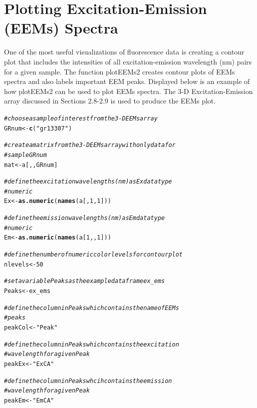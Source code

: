 \documentclass[a4paper,11pt]{article}\usepackage[]{graphicx}\usepackage[]{color}
\makeatletter
\newcommand{\hlnum}[1]{\textcolor[rgb]{0.686,0.059,0.569}{#1}}%
\newcommand{\hlstr}[1]{\textcolor[rgb]{0.192,0.494,0.8}{#1}}%
\newcommand{\hlcom}[1]{\textcolor[rgb]{0.678,0.584,0.686}{\textit{#1}}}%
\newcommand{\hlstd}[1]{\textcolor[rgb]{0.345,0.345,0.345}{#1}}%
\newcommand{\hlkwb}[1]{\textcolor[rgb]{0.69,0.353,0.396}{#1}}%
\newcommand{\hlkwd}[1]{\textcolor[rgb]{0.737,0.353,0.396}{\textbf{#1}}}%
\newenvironment{kframe}{%
 \def\at@end@of@kframe{}%
 \ifinner\ifhmode%
  \def\at@end@of@kframe{\end{minipage}}%
  \begin{minipage}{\columnwidth}%
 \fi\fi%
 \def\FrameCommand##1{\hskip\@totalleftmargin \hskip-\fboxsep
 \colorbox{shadecolor}{##1}\hskip-\fboxsep
     \hskip-\linewidth \hskip-\@totalleftmargin \hskip\columnwidth}%
 \MakeFramed {\advance\hsize-\width
   \@totalleftmargin\z@ \linewidth\hsize
   \@setminipage}}%
 {\par\unskip\endMakeFramed%
 \at@end@of@kframe}
\newenvironment{knitrout}{}{} %
\makeatother
\begin{document}
\section{Plotting Excitation-Emission (EEMs) Spectra}
One of the most useful visualizations of fluorescence data is creating a contour plot that includes the intensities of all excitation-emission wavelength (nm) pairs for a given sample. The function plotEEMs2 creates contour plots of EEMs spectra and also labels important EEM peaks. Displayed below is an example of how plotEEMs2 can be used to plot EEMs spectra. The 3-D Excitation-Emission array discussed in Sections 2.8-2.9 is used to produce the EEMs plot.

\begin{knitrout}
\color{fgcolor}\begin{kframe}
\begin{alltt}
\hlcom{# choose a sample of interest from the 3-D EEMs array}
\hlstd{GRnum} \hlkwb{<-} \hlkwd{c}\hlstd{(}\hlstr{"gr13307"}\hlstd{)}

\hlcom{# create a matrix from the 3-D EEMs array with only data for}
\hlcom{# sample GRnum}
\hlstd{mat} \hlkwb{<-} \hlstd{a[, , GRnum]}

\hlcom{# define the excitation wavelengths (nm) as Ex data type}
\hlcom{# numeric}
\hlstd{Ex} \hlkwb{<-} \hlkwd{as.numeric}\hlstd{(}\hlkwd{names}\hlstd{(a[,} \hlnum{1}\hlstd{,} \hlnum{1}\hlstd{]))}

\hlcom{# define the emission wavelengths (nm) as Em data type}
\hlcom{# numeric}
\hlstd{Em} \hlkwb{<-} \hlkwd{as.numeric}\hlstd{(}\hlkwd{names}\hlstd{(a[}\hlnum{1}\hlstd{, ,} \hlnum{1}\hlstd{]))}

\hlcom{# define the number of numeric color levels for contour plot}
\hlstd{nlevels} \hlkwb{<-} \hlnum{50}

\hlcom{# set a variable Peaks as the example dataframe ex_ems}
\hlstd{Peaks} \hlkwb{<-} \hlstd{ex_ems}

\hlcom{# define the column in Peaks which contains the name of EEMs}
\hlcom{# peaks}
\hlstd{peakCol} \hlkwb{<-} \hlstr{"Peak"}

\hlcom{# define the column in Peaks which contains the excitation}
\hlcom{# wavelength for a given Peak}
\hlstd{peakEx} \hlkwb{<-} \hlstr{"ExCA"}

\hlcom{# define the column in Peaks whcih contains the emission}
\hlcom{# wavelength for a given Peak}
\hlstd{peakEm} \hlkwb{<-} \hlstr{"EmCA"}


\end{alltt}
\end{kframe}
\end{knitrout}
\end{document}
